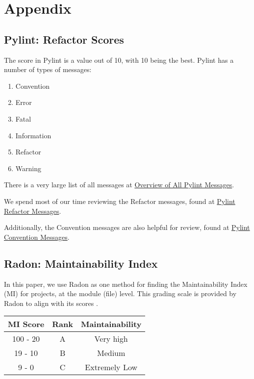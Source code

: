 \setcounter{chapter}{7}

\chapter*{Appendix} \label{chapterAppendix}

\section{Pylint: Refactor Scores} \label{appendixPylintRefactor}

The score in Pylint is a value out of 10, with 10 being the best. Pylint has a number of types of messages:
\begin{singlespace}
  \begin{enumerate}
    \item Convention
    \item Error
    \item Fatal
    \item Information
    \item Refactor
    \item Warning
  \end{enumerate}
\end{singlespace}

There is a very large list of all messages at \href{https://pylint.pycqa.org/en/latest/messages/messages_list.html}{Overview of All Pylint Messages}.

We spend most of our time reviewing the Refactor messages, found at \href{https://pylint.pycqa.org/en/latest/messages/messages_list.html#refactor}{Pylint Refactor Messages}.

Additionally, the Convention messages are also helpful for review, found at \href{https://pylint.pycqa.org/en/latest/messages/messages_list.html#convention}{Pylint Convention Messages}.

\section{Radon: Maintainability Index} \label{appendixRadonRefactor}

In this paper, we use Radon as one method for finding the Maintainability Index (MI) for projects, at the module (file) level. This grading scale is provided by Radon to align with its scores \cite{radon:docs}.

\begin{center}
  \begin{tabular}{ c c c }
    MI Score & Rank & Maintainability \\ \hline\hline
    100 - 20 & A & Very high \\ \hline
    19 - 10 & B & Medium \\ \hline
    9 - 0 & C & Extremely Low \\ \hline    
  \end{tabular}
\end{center}
